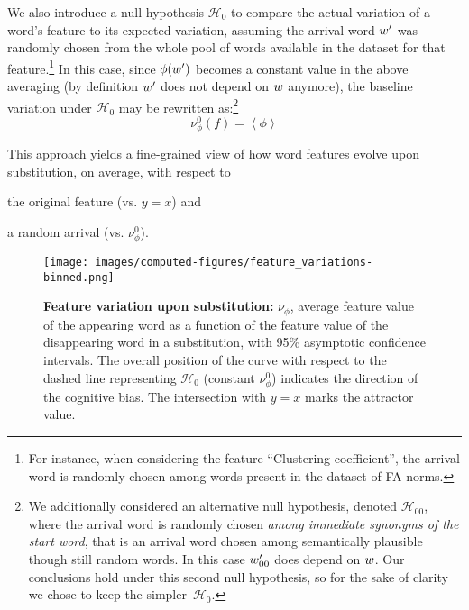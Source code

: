 We also introduce a null hypothesis $\mathcal{H}_0$ to compare the actual variation of a word's feature to its expected variation, assuming the arrival word $w'$ was randomly chosen from the whole pool of words available in the dataset for that feature.\footnote{For instance, when considering the feature ``Clustering coefficient'', the arrival word is randomly chosen among words present in the dataset of FA norms.}
In this case, since $\phi(w')$ becomes a constant value in the above averaging (by definition $w'$ does not depend on $w$ anymore),  the baseline variation under $\mathcal{H}_0$ may be rewritten as:\footnote{We additionally considered an alternative null hypothesis, denoted $\mathcal{H}_{00}$, where the arrival word is randomly chosen \emph{among immediate synonyms of the start word}, that is an arrival word chosen among semantically plausible though still random words. In this case $w'_{00}$ does depend on $w$. Our conclusions hold under this second null hypothesis, so for the sake of clarity we chose to keep the simpler~$\mathcal{H}_0$.}
$$\nu_{\phi}^0 (f) = \left<\phi\right>$$

This approach yields a fine-grained view of how word features evolve upon substitution, on average, with respect to
\begin{seriate}
\item the original feature (\hbox{vs.} $y=x$) and
\item a random arrival (\hbox{vs.} $\nu_{\phi}^0$).
\end{seriate}
\begin{figure*}[!th]
    \centering
    \texttt{[image: images/computed-figures/feature\_variations-binned.png]}
    \caption{\textbf{Feature variation upon substitution:} $\nu_\phi$, average feature value of the appearing word as a function of the feature value of the disappearing word in a substitution, with 95\% asymptotic confidence intervals.
    The overall position of the curve with respect to the dashed line representing $\mathcal{H}_0$ (constant $\nu_{\phi}^0$) indicates the direction of the cognitive bias.
    The intersection with $y = x$ marks the attractor value.
    }
    \label{fig:feature-variations}
\end{figure*}


